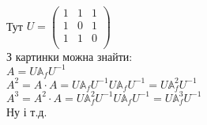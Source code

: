 \documentclass[a4paper, 14pt]{extarticle}
\def\bigline{\vspace{5mm}\\}
\begin{document}
\\
Тут $U = \begin{pmatrix}
1 & 1 & 1 \\
1 & 0 & 1 \\
1 & 1 & 0 \\
\end{pmatrix}$\\
З картинки можна знайти:\\
$A = U \mathbb{A}_f U^{-1}$\\
$A^2 = A\cdot A = U \mathbb{A}_f U^{-1} U \mathbb{A}_f U^{-1} = U \mathbb{A}_f^2 U^{-1}$\\
$A^3 = A^2 \cdot A = U \mathbb{A}^2_f U^{-1} U \mathbb{A}_f U^{-1} = U \mathbb{A}_f^3 U^{-1}$\\
Ну і т.д.
\bigline
\end{document}
